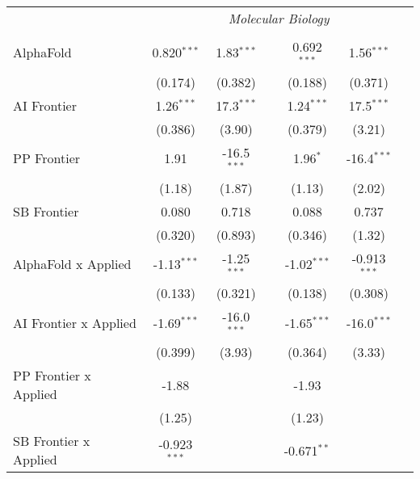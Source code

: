 \begin{tabular}{lcccccc}
 & \multicolumn{6}{c}{\textit{Molecular Biology}} \\ \\
   AlphaFold                      & 0.820$^{***}$  & 1.83$^{***}$  &                & 0.692$^{***}$ & 1.56$^{***}$   &   \\   
                                  & (0.174)        & (0.382)       &                & (0.188)       & (0.371)        &   \\   
   AI Frontier                    & 1.26$^{***}$   & 17.3$^{***}$  &                & 1.24$^{***}$  & 17.5$^{***}$   &   \\   
                                  & (0.386)        & (3.90)        &                & (0.379)       & (3.21)         &   \\   
   PP Frontier                    & 1.91           & -16.5$^{***}$ &                & 1.96$^{*}$    & -16.4$^{***}$  &   \\   
                                  & (1.18)         & (1.87)        &                & (1.13)        & (2.02)         &   \\   
   SB Frontier                    & 0.080          & 0.718         &                & 0.088         & 0.737          &   \\   
                                  & (0.320)        & (0.893)       &                & (0.346)       & (1.32)         &   \\   
   AlphaFold x Applied            & -1.13$^{***}$  & -1.25$^{***}$ &                & -1.02$^{***}$ & -0.913$^{***}$ &   \\   
                                  & (0.133)        & (0.321)       &                & (0.138)       & (0.308)        &   \\   
   AI Frontier x Applied          & -1.69$^{***}$  & -16.0$^{***}$ &                & -1.65$^{***}$ & -16.0$^{***}$  &   \\   
                                  & (0.399)        & (3.93)        &                & (0.364)       & (3.33)         &   \\   
   PP Frontier x Applied          & -1.88          &               &                & -1.93         &                &   \\   
                                  & (1.25)         &               &                & (1.23)        &                &   \\   
   SB Frontier x Applied          & -0.923$^{***}$ &               &                & -0.671$^{**}$ &                &   \\   

\end{tabular}
